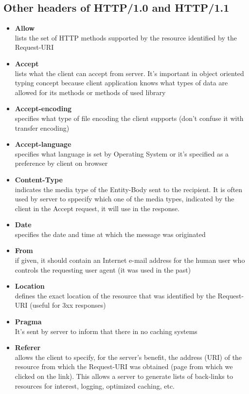 \subsection{Other headers of HTTP/1.0 and HTTP/1.1}
\begin{itemize}
\item{\textbf{Allow}\\
lists the set of HTTP methods supported by the resource identified by the Request-URI}
\item{\textbf{Accept}\\
lists what the client can accept from server. It's important in object oriented typing concept because client application knows what types of data are allowed for its methods or methods of used library}\\
\item{\textbf{Accept-encoding}\\
specifies what type of file encoding the client supports (don't confuse it with transfer encoding)}\\
\item{\textbf{Accept-language}\\
specifies what language is set by Operating System or it's specified as a preference by client on browser}\\
\item{\textbf{Content-Type}\\
indicates the media type of the Entity-Body sent to the recipient. It is often used by server to sppecify which one of the media types, indicated by the client in the Accept request, it will use in the response.}
\item{\textbf{Date}\\
specifies the date and time at which the message was originated}
\item{\textbf{From}\\
if given, it should contain an Internet e-mail address for the human user who controls the requesting user agent (it was used in the past)}
\item{\textbf{Location}\\
defines the exact location of the resource that was identified by the Request-URI (useful for 3xx responses)}
\item{\textbf{Pragma}\\
It's sent by server to inform that there in no caching systems}\\
\item{\textbf{Referer}\\
allows the client to specify, for the server's benefit, the address (URI) of the resource from which the Request-URI was obtained (page from which we clicked on the link). This allows a server to generate lists of back-links to resources for interest, logging, optimized caching, etc.
}
\end{itemize}
